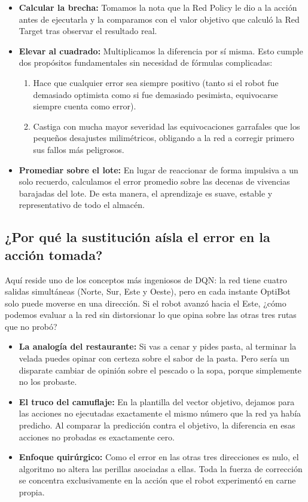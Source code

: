 \begin{itemize}
  \item \textbf{Calcular la brecha:} Tomamos la nota que la Red Policy le dio a la acción antes de ejecutarla y la comparamos con el valor objetivo que calculó la Red Target tras observar el resultado real.
  \item \textbf{Elevar al cuadrado:} Multiplicamos la diferencia por sí misma. Esto cumple dos propósitos fundamentales sin necesidad de fórmulas complicadas:
  \begin{enumerate}
    \item Hace que cualquier error sea siempre positivo (tanto si el robot fue demasiado optimista como si fue demasiado pesimista, equivocarse siempre cuenta como error).
    \item Castiga con mucha mayor severidad las equivocaciones garrafales que los pequeños desajustes milimétricos, obligando a la red a corregir primero sus fallos más peligrosos.
  \end{enumerate}
  \item \textbf{Promediar sobre el lote:} En lugar de reaccionar de forma impulsiva a un solo recuerdo, calculamos el error promedio sobre las decenas de vivencias barajadas del lote. De esta manera, el aprendizaje es suave, estable y representativo de todo el almacén.
\end{itemize}

\subsection{¿Por qué la sustitución aísla el error en la acción tomada?}
Aquí reside uno de los conceptos más ingeniosos de DQN: la red tiene cuatro salidas simultáneas (Norte, Sur, Este y Oeste), pero en cada instante OptiBot solo puede moverse en una dirección. Si el robot avanzó hacia el Este, ¿cómo podemos evaluar a la red sin distorsionar lo que opina sobre las otras tres rutas que no probó?

\begin{itemize}
  \item \textbf{La analogía del restaurante:} Si vas a cenar y pides pasta, al terminar la velada puedes opinar con certeza sobre el sabor de la pasta. Pero sería un disparate cambiar de opinión sobre el pescado o la sopa, porque simplemente no los probaste.
  \item \textbf{El truco del camuflaje:} En la plantilla del vector objetivo, dejamos para las acciones no ejecutadas exactamente el mismo número que la red ya había predicho. Al comparar la predicción contra el objetivo, la diferencia en esas acciones no probadas es exactamente cero.
  \item \textbf{Enfoque quirúrgico:} Como el error en las otras tres direcciones es nulo, el algoritmo no altera las perillas asociadas a ellas. Toda la fuerza de corrección se concentra exclusivamente en la acción que el robot experimentó en carne propia.
\end{itemize}

